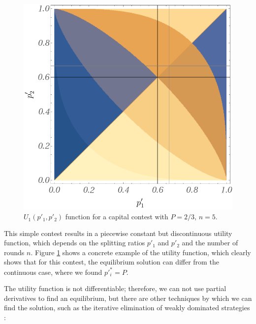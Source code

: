 \documentclass{article}
\theoremstyle{definition}
\begin{document}
\begin{figure}[H]
    \centering
    \includegraphics[width=12 cm]{img/Contest_Discrete_Up1p2_5.png}
    \caption{$U_1(p'_1,p'_2)$ function for a capital contest with $P=2/3$, $n=5$.}
    \label{fig:Contest_Up1p2_Disco}
\end{figure}

This simple contest results in a piecewise constant but discontinuous utility function, which depends on the splitting ratios $p'_1$ and $p'_2$ and the number of rounds $n$. 
Figure \ref{fig:Contest_Up1p2_Disco} shows a concrete example of the utility function, which clearly shows that for this contest, the equilibrium solution can differ from the continuous case, where we found $p'^*_i=P$.

The utility function is not differentiable; therefore, we can not use partial derivatives to find an equilibrium, but there are other techniques by which we can find the solution, such as the iterative elimination of weakly dominated strategies \cite{book:GameTheory}:
\end{document}
